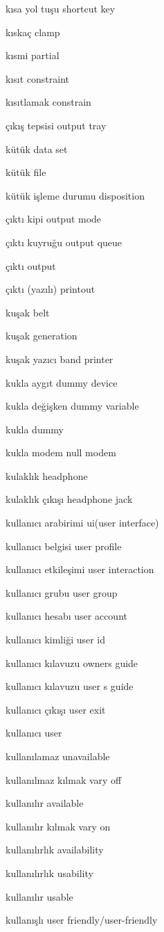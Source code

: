 \documentclass[12pt,fleqn]{article}\usepackage{../../common}
\begin{document}
kısa yol tuşu shortcut key

kıskaç clamp

kısmi partial

kısıt constraint

kısıtlamak constrain

çıkış tepsisi output tray

kütük data set

kütük file

kütük işleme durumu disposition

çıktı kipi output mode

çıktı kuyruğu output queue

çıktı output

çıktı (yazılı) printout

kuşak belt

kuşak generation

kuşak yazıcı band printer

kukla aygıt dummy device

kukla değişken dummy variable

kukla dummy

kukla modem null modem

kulaklık headphone

kulaklık çıkışı headphone jack

kullanıcı arabirimi ui(user interface)

kullanıcı belgisi user profile

kullanıcı etkileşimi user interaction

kullanıcı grubu user group

kullanıcı hesabı user account

kullanıcı kimliği user id

kullanıcı kılavuzu owners guide

kullanıcı kılavuzu user s guide

kullanıcı çıkışı user exit

kullanıcı user

kullanılamaz unavailable

kullanılmaz kılmak vary off

kullanılır available

kullanılır kılmak vary on

kullanılırlık availability

kullanılırlık usability

kullanılır usable

kullanışlı user friendly/user-friendly
\end{document}
